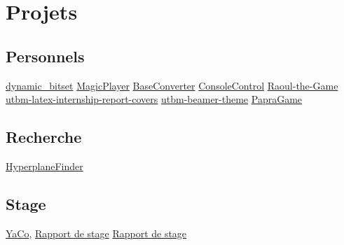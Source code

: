 \documentclass[letterpaper,10pt,sans]{moderncv}
\begin{document}

	\vspace*{\deletedSpace}
	\section{Projets}
		\subsection{Personnels}
				{\href{https://github.com/pinam45/dynamic_bitset}{dynamic\_bitset}}
				{\href{https://github.com/pinam45/MagicPlayer}{MagicPlayer}}
				{\href{https://github.com/pinam45/BaseConverter}{BaseConverter}}
				{\href{https://github.com/pinam45/ConsoleControl}{ConsoleControl}}
				{\href{https://github.com/TiWinDeTea/Raoul-the-Game}{Raoul-the-Game}}
				{\href{https://github.com/pinam45/utbm-latex-internship-report-covers}{utbm-latex-internship-report-covers}}
				{\href{https://github.com/pinam45/utbm-beamer-theme}{utbm-beamer-theme}}
				{\href{https://github.com/TiWinDeTea/PapraGame}{PapraGame}}
		\subsection{Recherche}
				{\href{https://github.com/Lomadriel/HyperplaneFinder}{HyperplaneFinder}}
		\subsection{Stage}
				{\href{https://github.com/DGA-MI-SSI/YaCo}{YaCo}, \href{https://github.com/pinam45/UTBM_ST40_Rapport_de_stage_DGA}{Rapport de stage}}
				{\href{https://github.com/pinam45/UTBM_ST40_Rapport_de_stage_DGA}{Rapport de stage}}
\end{document}
